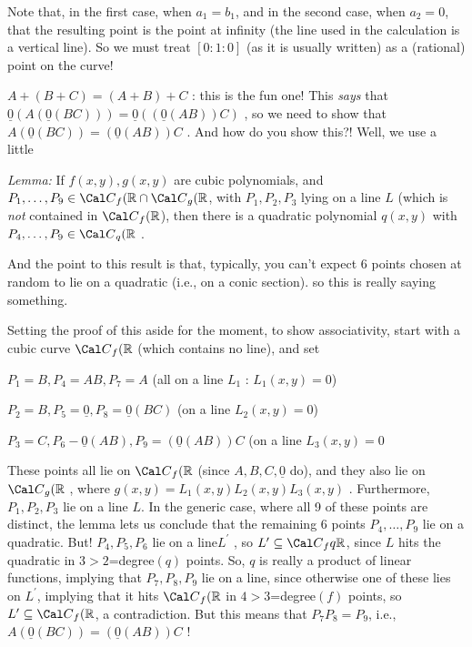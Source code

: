 \ssk

Note that, in the first case, when $a_1=b_1$, and in the second case, when $a_2=0$, that the 
resulting point is the point at infinity (the line used in the calculation is a vertical line). So we 
must treat $[0:1:0]$ (as it is usually written) as a (rational) point on the curve!

\vfill\eject

$A+(B+C)= (A+B)+C$ : this is the fun one! This {\it says} that
\hhsk
$\underline{0}(A(\underline{0}(BC))) = \underline{0}((\underline{0}(AB))C)$
\hhsk, so we need to show that 
\hhsk $A(\underline{0}(BC)) =(\underline{0}(AB))C$ . And how do you
show this?! Well, we use a little

\ssk

{\it Lemma:} If $f(x,y),g(x,y)$ are cubic polynomials, and 
$P_1,\ldots,P_9\in{\Cal C}_f({\Bbb R}\cap{\Cal C}_g({\Bbb R}$, with
$P_1,P_2,P_3$ lying on a line $L$ (which is {\it not} contained in
${\Cal C}_f({\Bbb R}$), then there is a quadratic 
polynomial $q(x,y)$ with $P_4,\ldots,P_9\in{\Cal C}_q({\Bbb R}$ .

\ssk

And the point to this result is that, typically, you can't expect 6 points
chosen at random to lie on a quadratic (i.e., on a conic section). so this 
is really saying something.

\ssk

Setting the proof of this aside for the moment, to show associativity,
start with a cubic curve ${\Cal C}_f({\Bbb R}$ (which contains no line), and
set 

\ssk

$P_1=B,P_4=AB,P_7=A$ (all on a line $L_1$ : $L_1(x,y)=0$)

$P_2=B,P_5=\underline{0},P_8=\underline{0}(BC)$ (on a line $L_2(x,y)=0$)

$P_3=C,P_6-\underline{0}(AB),P_9=(\underline{0}(AB))C$ (on a line $L_3(x,y)=0$

\ssk

These points all lie on ${\Cal C}_f({\Bbb R}$ (since $A,B,C,\underline{0}$ do), and they
also lie on ${\Cal C}_g({\Bbb R}$ , where $g(x,y)=L_1(x,y)L_2(x,y)L_3(x,y)$ . Furthermore,
$P_1,P_2,P_3$ lie on a line $L$. In the generic case, where all 9 of these points are 
distinct, the lemma lets us conclude that the remaining 6 points $P_4,\ldots,P_9$ lie on a
quadratic. But! $P_4,P_5,P_6$  lie on a line$L^\prime$ , so 
$L^\prime\subseteq{\Cal C}_fq{\Bbb R}$, since $L$ hits the quadratic in 
$3>2$=degree$(q)$ points. So, $q$ is really a product of linear functions, implying
that $P_7,P_8,P_9$ lie on a line, since otherwise one of these lies on $L^\prime$,
implying that it hits ${\Cal C}_f({\Bbb R}$ in $4>3$=degree$(f)$ points, 
so $L^\prime\subseteq{\Cal C}_f({\Bbb R}$, a contradiction. But this
means that $P_7P_8=P_9$, i.e., $A(\underline{0}(BC))=(\underline{0}(AB))C$ !

